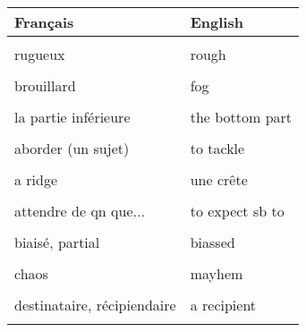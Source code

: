 \documentclass[
  10pt,
]{article}
\begin{document}
\begin{longtable}{ll}
\toprule
Français & English\\
\midrule
\cellcolor{gray!6}{flou} & \cellcolor{gray!6}{blurry}\\

rugueux & rough\\

\cellcolor{gray!6}{doux (au toucher)} & \cellcolor{gray!6}{smooth}\\

brouillard & fog\\

\cellcolor{gray!6}{brume} & \cellcolor{gray!6}{mist}\\

la partie inférieure & the bottom part\\

\cellcolor{gray!6}{la partie supérieure} & \cellcolor{gray!6}{the upper part}\\

aborder (un sujet) & to tackle\\

\cellcolor{gray!6}{à haute criminalité} & \cellcolor{gray!6}{crime-ridden}\\

a ridge & une crête\\

\cellcolor{gray!6}{atroce, ou criard} & \cellcolor{gray!6}{lurid}\\

attendre de qn que... & to expect sb to\\

\cellcolor{gray!6}{au premier plan} & \cellcolor{gray!6}{in the foreground}\\

biaisé, partial & biassed\\

\cellcolor{gray!6}{ce qui est produit, ce qui sort} & \cellcolor{gray!6}{the output}\\

chaos & mayhem\\

\cellcolor{gray!6}{comestible} & \cellcolor{gray!6}{edible}\\

destinataire, récipiendaire & a recipient\\

\cellcolor{gray!6}{diffuser} & \cellcolor{gray!6}{to broadcast}\\


\end{longtable}
\end{document}
